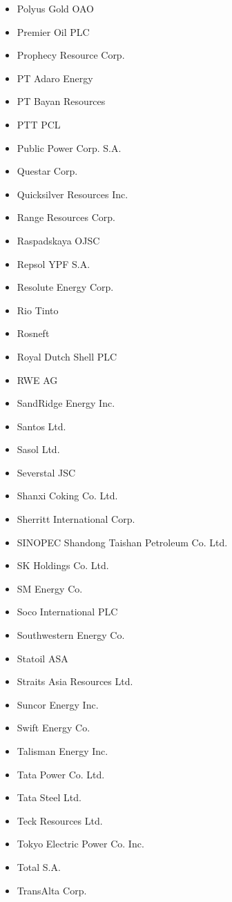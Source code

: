 \begin{itemize}
  \item Polyus Gold OAO
  \item Premier Oil PLC
  \item Prophecy Resource Corp.
  \item PT Adaro Energy
  \item PT Bayan Resources
  \item PTT PCL
  \item Public Power Corp. S.A.
  \item Questar Corp.
  \item Quicksilver Resources Inc.
  \item Range Resources Corp.
  \item Raspadskaya OJSC
  \item Repsol YPF S.A.
  \item Resolute Energy Corp.
  \item Rio Tinto
  \item Rosneft
  \item Royal Dutch Shell PLC
  \item RWE AG
  \item SandRidge Energy Inc.
  \item Santos Ltd.
  \item Sasol Ltd.
  \item Severstal JSC
  \item Shanxi Coking Co. Ltd.
  \item Sherritt International Corp.
  \item SINOPEC Shandong Taishan Petroleum Co. Ltd.
  \item SK Holdings Co. Ltd.
  \item SM Energy Co.
  \item Soco International PLC
  \item Southwestern Energy Co.
  \item Statoil ASA
  \item Straits Asia Resources Ltd.
  \item Suncor Energy Inc.
  \item Swift Energy Co.
  \item Talisman Energy Inc.
  \item Tata Power Co. Ltd.
  \item Tata Steel Ltd.
  \item Teck Resources Ltd.
  \item Tokyo Electric Power Co. Inc.
  \item Total S.A.
  \item TransAlta Corp.

\end{itemize}
